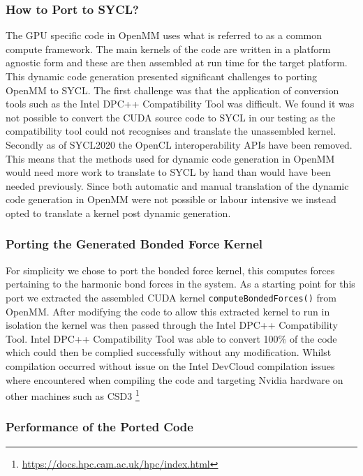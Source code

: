 \subsubsection{How to Port to SYCL?}

The GPU specific code in OpenMM uses what is referred to as a common compute framework. The main kernels of the code are written in a platform agnostic form and these are then assembled at run time for the target platform. This dynamic code generation presented significant challenges to porting OpenMM to SYCL. The first challenge was that the application of conversion tools such as the Intel DPC++ Compatibility Tool was difficult. We found it was not possible to convert the CUDA source code to SYCL in our testing as the compatibility tool could not recognises and translate the unassembled kernel. Secondly as of SYCL2020 the OpenCL interoperability APIs have been removed. This means that the methods used for dynamic code generation in OpenMM would need more work to translate to SYCL by hand than would have been needed previously. Since both automatic and manual translation of the dynamic code generation in OpenMM were not possible or labour intensive we instead opted to translate a kernel post dynamic generation.

\subsubsection{Porting the Generated Bonded Force Kernel}

For simplicity we chose to port the bonded force kernel, this computes forces pertaining to the harmonic bond forces in the system. As a starting point for this port we extracted the assembled CUDA kernel \verb!computeBondedForces()! from OpenMM. After modifying the code to allow this extracted kernel to run in isolation the kernel was then passed through the Intel DPC++ Compatibility Tool. Intel DPC++ Compatibility Tool was able to convert 100$\%$ of the code which could then be complied successfully without any modification. Whilst compilation occurred without issue on the Intel DevCloud compilation issues where encountered when compiling the code and targeting Nvidia hardware on other machines such as CSD3 \footnote{\url{https://docs.hpc.cam.ac.uk/hpc/index.html}}

\subsubsection{Performance of the Ported Code}

